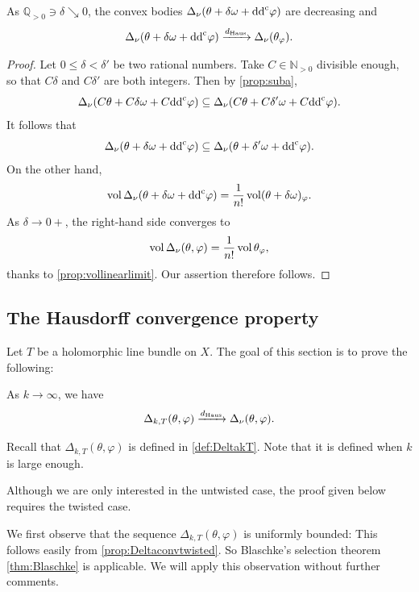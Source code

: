 \begin{proposition}\label{prop:Deltapert}
    As $\mathbb{Q}_{>0}\ni\delta\searrow 0$, the convex bodies $\Delta_{\nu}(\theta+\delta\omega+\mathrm{dd}^{\mathrm{c}}\varphi)$ are decreasing and
    \[
    \Delta_{\nu}(\theta+\delta\omega+\mathrm{dd}^{\mathrm{c}}\varphi)\xrightarrow{d_{\mathrm{Haus}}} \Delta_{\nu}(\theta_{\varphi}).
    \]
\end{proposition}

\begin{proof}
	Let $0\leq \delta<\delta'$ be two rational numbers. Take $C\in \mathbb{N}_{>0}$ divisible enough, so that $C\delta$ and $C\delta'$ are both integers. Then by \cref{prop:suba},
	\[
		\Delta_{\nu}(C\theta+C\delta\omega+C\mathrm{dd}^{\mathrm{c}}\varphi)\subseteq \Delta_{\nu}(C\theta+C\delta'\omega+C\mathrm{dd}^{\mathrm{c}} \varphi).
	\]
	It follows that
	\[
		\Delta_{\nu}(\theta+\delta\omega+\mathrm{dd}^{\mathrm{c}}\varphi)\subseteq \Delta_{\nu}(\theta+\delta'\omega+\mathrm{dd}^{\mathrm{c}}\varphi).
	\]
	On the other hand,
	\[
		\operatorname{vol}   \Delta_{\nu}(\theta+\delta\omega+\mathrm{dd}^{\mathrm{c}}\varphi)=\frac{1}{n!}\operatorname{vol} (\theta+\delta\omega)_{\varphi}.
	\]
	As $\delta\to 0+$, the right-hand side converges to
	\[
		\operatorname{vol} \Delta_{\nu}(\theta,\varphi)=\frac{1}{n!}\operatorname{vol} \theta_{\varphi},
	\]
    thanks to \cref{prop:vollinearlimit}.
	Our assertion therefore follows.
\end{proof}

\subsection{The Hausdorff convergence property}
\label{subsec:HCP}
Let $T$ be a holomorphic line bundle on $X$. The goal of this section is to prove the following:
\begin{theorem}\label{thm:HCP}
    As $k\to\infty$, we have
    \begin{equation}\label{eq:HCP1}
    \Delta_{k,T}(\theta,\varphi)\xrightarrow{d_{\mathrm{Haus}}} \Delta_{\nu}(\theta,\varphi).
    \end{equation}
\end{theorem}
Recall that $\Delta_{k,T}(\theta,\varphi)$ is defined in \cref{def:DeltakT}. Note that it is defined when $k$ is large enough.

Although we are only interested in the untwisted case, the proof given below requires the twisted case.

We first observe that the sequence $\Delta_{k,T}(\theta,\varphi)$ is uniformly bounded: This follows easily from \cref{prop:Deltaconvtwisted}. So Blaschke's selection theorem \cref{thm:Blaschke} is applicable. We will apply this observation without further comments.


